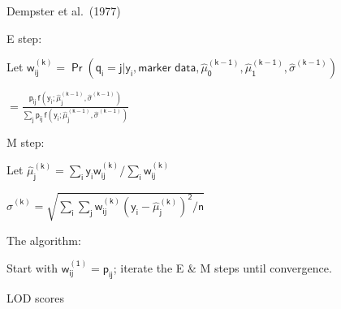 \documentclass[12pt]{article}
\newcommand{\headsize}{\fontsize{35}{35} \selectfont}
\newcommand{\smallsize}{\fontsize{25}{30} \selectfont}
\begin{document}
\hfill
\begin{minipage}{10in}
\color{mywhite} \smallsize
 Dempster et al.\ (1977)
\vspace{5mm}

 {\color{mypink} E step}:
\vspace{5mm}

\hspace{10mm} Let \hspace{5mm} $\mathsf{w_{ij}^{(k)} = \Pr(q_i = j | y_i,\text{marker
data},\hat{\mu}_0^{(k-1)}, \hat{\mu}_1^{(k-1)},\hat{\sigma}^{(k-1)})}$
\vspace{5mm}

\hspace{56mm} $\mathsf{ = \frac{p_{ij} \,
f(y_i; \hat{\mu}_j^{(k-1)},\hat{\sigma}^{(k-1)})}{
\sum_j p_{ij} \, f(y_i; \hat{\mu}_j^{(k-1)},\hat{\sigma}^{(k-1)})}}$
\vspace{5mm}

 {\color{mypink} M step}:
\vspace{5mm}

\hspace{10mm} Let \hspace{5mm} $\mathsf{\hat{\mu}_j^{(k)} = \sum_i y_i w_{ij}^{(k)} / \sum_i
w_{ij}^{(k)}}$
\vspace{5mm}

\hspace{31.5mm} $\mathsf{\hat{\sigma}^{(k)} = \sqrt{ \sum_i \sum_j w_{ij}^{(k)}
(y_i-\hat{\mu}_j^{(k)})^2/n}}$
\vspace{5mm}

 {\color{mypink} The algorithm}:
\vspace{5mm}

\hspace{10mm} Start with $\mathsf{w_{ij}^{(1)} = p_{ij}}$; iterate the E \& M steps until
convergence.
\end{minipage}



\newpage

\headsize \color{myyellow}
\hfill \begin{minipage}{5.75in}
\centering
LOD scores
\end{minipage}

\vspace{25mm}
\end{document}
